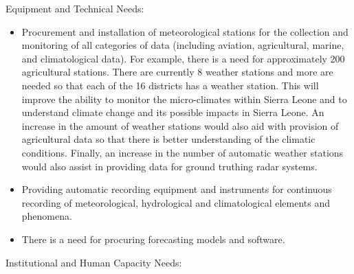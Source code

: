\documentclass[
]{book}
\begin{document}
Equipment and Technical Needs:

\begin{itemize}
\item
  Procurement and installation of meteorological stations for the collection and monitoring of all categories of data (including aviation, agricultural, marine, and climatological data). For example, there is a need for approximately 200 agricultural stations. There are currently 8 weather stations and more are needed so that each of the 16 districts has a weather station. This will improve the ability to monitor the micro-climates within Sierra Leone and to understand climate change and its possible impacts in Sierra Leone. An increase in the amount of weather stations would also aid with provision of agricultural data so that there is better understanding of the climatic conditions. Finally, an increase in the number of automatic weather stations would also assist in providing data for ground truthing radar systems.
\item
  Providing automatic recording equipment and instruments for continuous recording of meteorological, hydrological and climatological elements and phenomena.
\item
  There is a need for procuring forecasting models and software.
\end{itemize}

Institutional and Human Capacity Needs:
\end{document}
